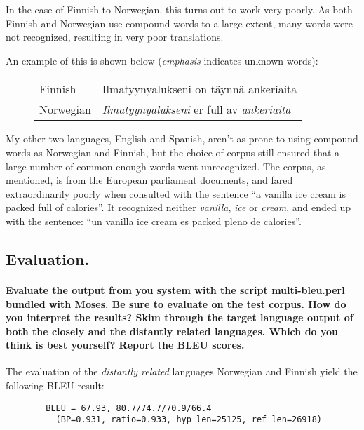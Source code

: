 \documentclass[11pt,a4paper]{article}
\begin{document}
      In the case of Finnish to Norwegian, this turns out to work very poorly.
      As both Finnish and Norwegian use compound words to a large extent, many words were not recognized, resulting in very poor translations.

      An example of this is shown below (\emph{emphasis} indicates unknown words):

      \begin{figure}[h!]
        \begin{tabular}{l|l}
           Finnish   & Ilmatyynyalukseni on täynnä ankeriaita \\
           Norwegian & \emph{Ilmatyynyalukseni} er full av \emph{ankeriaita}
        \end{tabular}
      \end{figure}

      My other two languages, English and Spanish, aren't as prone to using compound words as Norwegian and Finnish, but the choice of corpus still ensured that a large number of common enough words went unrecognized.
      The corpus, as mentioned, is from the European parliament documents, and fared extraordinarily poorly when consulted with the sentence ``a vanilla ice cream is packed full of calories''.
      It recognized neither \emph{vanilla}, \emph{ice} or \emph{cream}, and ended up with the sentence: ``un vanilla ice cream es packed pleno de calories''.

    \subsection{Evaluation.} %

      \paragraph{Evaluate the output from you system with the script multi-bleu.perl bundled with Moses.
      Be sure to evaluate on the test corpus. How do you interpret the results?
      Skim through the target language output of both the closely and the distantly related languages.
      Which do you think is best yourself? Report the BLEU scores.}

      The evaluation of the \emph{distantly related} languages Norwegian and Finnish yield the following BLEU result:

      \begin{verbatim}
        BLEU = 67.93, 80.7/74.7/70.9/66.4
          (BP=0.931, ratio=0.933, hyp_len=25125, ref_len=26918)
      \end{verbatim}
\end{document}
